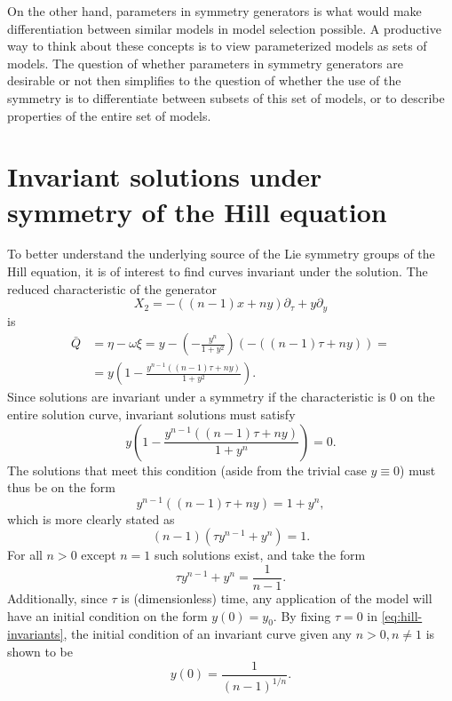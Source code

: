 On the other hand, parameters in symmetry generators is what would make differentiation between similar models in model selection possible.
A productive way to think about these concepts is to view parameterized models as sets of models.
The question of whether parameters in symmetry generators are desirable or not then simplifies to the question of whether the use of the symmetry is to differentiate between subsets of this set of models, or to describe properties of the entire set of models.



\section{Invariant solutions under symmetry of the Hill equation}

To better understand the underlying source of the Lie symmetry groups of the Hill equation, it is of interest to find curves invariant under the solution.
The reduced characteristic of the generator
\begin{equation*}
  X_2 = - \left( (n-1) x + n y \right) \partial_\tau + y \partial_y
\end{equation*}
is
\begin{align*}
  \bar{Q} &= 
  \eta - \omega \xi = 
  y - \left( -\frac{y^n}{1+y^2} \right) \left( - \left( (n-1) \tau + n y \right) \right) =\\
  &= y \left(1 -\frac{y^{n-1} \left( (n-1) \tau + n y \right)}{1+y^2} \right).
\end{align*}
Since solutions are invariant under a symmetry if the characteristic is 0 on the entire solution curve, invariant solutions must satisfy
\begin{equation*}
  y \left(1 -\frac{y^{n-1} \left( (n-1) \tau + n y \right)}{1+y^n} \right) = 0.
\end{equation*}
The solutions that meet this condition (aside from the trivial case \(y \equiv 0\)) must thus be on the form
\begin{equation*}
  y^{n-1} \left( (n-1) \tau + n y \right) = 1+y^n,
\end{equation*}
which is more clearly stated as
\begin{equation*}
  (n-1) \left( \tau y^{n-1} + y^n \right) = 1.
\end{equation*}
For all \(n>0\) except \(n=1\) such solutions exist, and take the form
\begin{equation} \label{eq:hill-invariants}
  \tau y^{n-1} + y^n = \frac{1}{n-1}.
\end{equation}
Additionally, since \(\tau\) is (dimensionless) time, any application of the model will have an initial condition on the form \(y(0) = y_0\).
By fixing \(\tau=0\) in \cref{eq:hill-invariants}, the initial condition of an invariant curve given any \(n>0, n\neq1\) is shown to be
\begin{equation*}
  y(0) =\frac{1}{(n-1)^{1/n}}.
\end{equation*}


